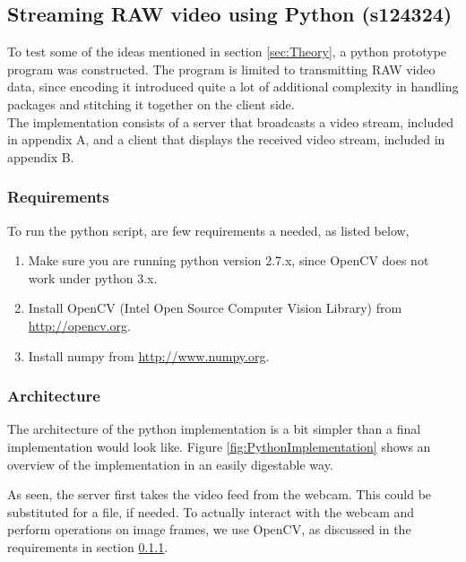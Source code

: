 \subsection{Streaming RAW video using Python (s124324)}\label{subsec:python}
To test some of the ideas mentioned in section \ref{sec:Theory}, a python prototype program was constructed. The program is limited to transmitting RAW video data, since encoding it introduced quite a lot of additional complexity in handling packages and stitching it together on the client side.\\

The implementation consists of a server that broadcasts a video stream, included in appendix A, and a client that displays the received video stream, included in appendix B.

\subsubsection{Requirements}\label{subsubsec:requirements}
To run the python script, are few requirements a needed, as listed below,

\begin{enumerate}
    \item Make sure you are running python version 2.7.x, since OpenCV does not work under python 3.x.
    \item Install OpenCV (Intel Open Source Computer Vision Library) from \href{http://opencv.org}{http://opencv.org}.
    \item Install numpy from \href{http://www.numpy.org}{http://www.numpy.org}.
\end{enumerate}


\subsubsection{Architecture}
The architecture of the python implementation is a bit simpler than a final implementation would look like. Figure \ref{fig:PythonImplementation} shows an overview of the implementation in an easily digestable way.


As seen, the server first takes the video feed from the webcam. This could be substituted for a file, if needed. To actually interact with the webcam and perform operations on image frames, we use OpenCV, as discussed in the requirements in section \ref{subsubsec:requirements}.

